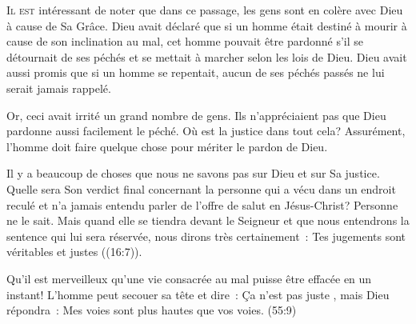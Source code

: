 \lettrine{I}{l est} intéressant de noter que dans ce passage,
 les gens sont en colère avec Dieu à cause de Sa Grâce.
 Dieu avait déclaré que si un homme était destiné à mourir
 à cause de son inclination au mal, cet homme pouvait être pardonné
 s'il se détournait de ses péchés et se mettait à marcher
 selon les lois de Dieu. Dieu avait aussi promis que si un homme se repentait,
 aucun de ses péchés passés ne lui serait jamais rappelé. 

Or, ceci avait irrité un grand nombre de gens. Ils n'appréciaient pas que Dieu
 pardonne aussi facilement le péché. Où est la justice dans tout cela?
 Assurément, l'homme doit faire quelque chose pour mériter le pardon de Dieu. 

Il y a beaucoup de choses que nous ne savons pas sur Dieu et sur Sa justice.
 Quelle sera Son verdict final concernant la personne qui a vécu
 dans un endroit reculé et n'a jamais entendu parler de l'offre de salut
 en Jésus-Christ? Personne ne le sait. Mais quand elle se tiendra
 devant le Seigneur et que nous entendrons la sentence qui lui sera réservée,
 nous dirons très certainement~: 
 \Og Tes jugements sont véritables et justes \Fg{} ((16:7)). 



Qu'il est merveilleux qu'une vie consacrée au mal puisse être effacée
 en un instant! L'homme peut secouer sa tête et dire~: 
 \Og Ça n'est pas juste \Fg{}, mais Dieu répondra~: 
 \Og Mes voies sont plus hautes que vos voies. \Fg{}
 (55:9)

\dvrule








